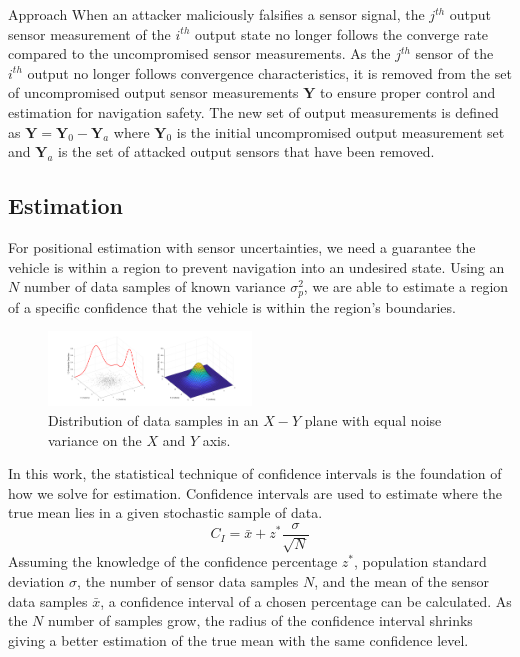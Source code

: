 \begin{section}{Approach}
When an attacker maliciously falsifies a sensor signal, the $j^{th}$ output sensor measurement of the $i^{th}$ output state no longer follows the converge rate compared to the uncompromised sensor measurements. As the $j^{th}$ sensor of the $i^{th}$ output no longer follows convergence characteristics, it is removed from the set of uncompromised output sensor measurements $\bm{Y}$ to ensure proper control and estimation for navigation safety. The new set of output measurements is defined as $\bm{Y}=\bm{Y}_0-\bm{Y}_a$ where $\bm{Y}_0$ is the initial uncompromised output measurement set and $\bm{Y}_a$ is the set of attacked output sensors that have been removed.



\subsection{Estimation}
For positional estimation with sensor uncertainties, we need a guarantee the vehicle is within a region to prevent navigation into an undesired state. Using an $N$ number of data samples of known variance $\sigma_p^2$, we are able to estimate a region of a specific confidence that the vehicle is within the region's boundaries.
\begin{figure}[ht!]
\vspace{1pt}
\centering
\includegraphics[width=0.48\textwidth]{GaussianPDF.png}
\caption{Distribution of data samples in an $X-Y$ plane with equal noise variance on the $X$ and $Y$ axis.}
\label{fig:gauss_pdf}
\end{figure}
In this work, the statistical technique of confidence intervals is the foundation of how we solve for estimation. Confidence intervals are used to estimate where the true mean lies in a given stochastic sample of data. 
    \begin{equation}
     \label{Confidence_interval}
		C_I = \bar{x} + z^{*}\frac{\sigma}{\sqrt{N}}
	\end{equation}
Assuming the knowledge of the confidence percentage $z^{*}$, population standard deviation $ \sigma $, the number of sensor data samples $N$, and the mean of the sensor data samples $ \bar{x} $, a confidence interval of a chosen percentage can be calculated. As the $N$ number of samples grow, the radius of the confidence interval shrinks giving a better estimation of the true mean with the same confidence level.


\end{section}
